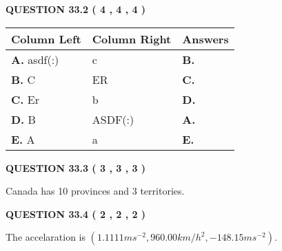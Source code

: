 \documentclass[12pt]{article}
\begin{document}
\vspace{0.2in}
  
{\textbf{\Large{QUESTION
33.2 
 (           4 ,           4 ,           4 )
}}}
  
  
 
 
\noindent{}
  
  
\begin{tabular}{|l|l|l|}
 \hline
 Column Left & Column Right  & Answers       \\ 
 \hline
{\textbf{\large{
A.}}}
asdf(:)
  & 
c
 & 
{\textbf{\large{
B.}}}
 \\ 
 \hline
{\textbf{\large{
B.}}}
C
  & 
ER
 & 
{\textbf{\large{
C.}}}
 \\ 
 \hline
{\textbf{\large{
C.}}}
Er
  & 
b
 & 
{\textbf{\large{
D.}}}
 \\ 
 \hline
{\textbf{\large{
D.}}}
B
  & 
ASDF(:)
 & 
{\textbf{\large{
A.}}}
 \\ 
 \hline
{\textbf{\large{
E.}}}
A
  & 
a
 & 
{\textbf{\large{
E.}}}
 \\ 
 \hline
 \end{tabular}
  
  
 
 
 
 
  
\vspace{0.2in}
  
{\textbf{\Large{QUESTION
33.3 
 (           3 ,           3 ,           3 )
}}}
  
  
 
 
\noindent{}
 
 
Canada has  %
10 provinces and  %
3 territories.
 
 
 
 
  
\vspace{0.2in}
  
{\textbf{\Large{QUESTION
33.4 
 (           2 ,           2 ,           2 )
}}}
  
  
 
 
\noindent{}
 
 
The accelaration is
$(
1.1111ms^{-2},
960.00km/h^2,
-148.15ms^{-2}
).
$
 
 
 
\end{document}
